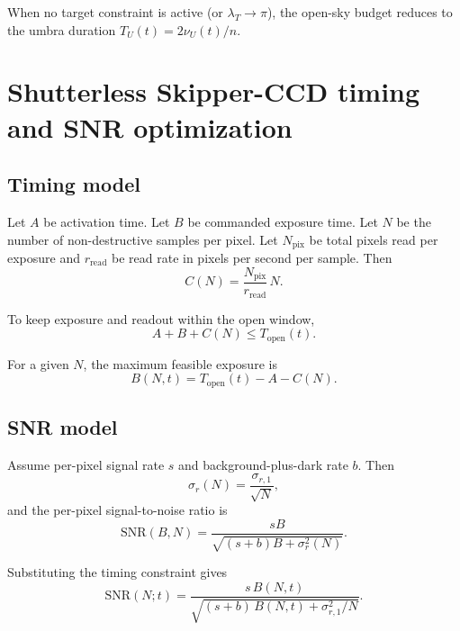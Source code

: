 \documentclass[preprint,12pt]{elsarticle}
\theoremstyle{definition}
\theoremstyle{remark}
\begin{document}
When no target constraint is active (or $\lambda_T \to \pi$), the open-sky budget reduces to the umbra duration $T_U(t)=2\nu_U(t)/n$.

\section{Shutterless Skipper-CCD timing and SNR optimization}

\subsection{Timing model}

Let $A$ be activation time.
Let $B$ be commanded exposure time.
Let $N$ be the number of non-destructive samples per pixel.
Let $N_{\mathrm{pix}}$ be total pixels read per exposure and $r_{\mathrm{read}}$ be read rate in pixels per second per sample.
Then
\begin{equation}
C(N)=\frac{N_{\mathrm{pix}}}{r_{\mathrm{read}}}\,N.
\label{eq:CN}
\end{equation}

To keep exposure and readout within the open window,
\begin{equation}
A+B+C(N)\le T_{\mathrm{open}}(t).
\label{eq:time_constraint}
\end{equation}

For a given $N$, the maximum feasible exposure is
\begin{equation}
B(N,t)=T_{\mathrm{open}}(t)-A-C(N).
\label{eq:BofN}
\end{equation}

\subsection{SNR model}

Assume per-pixel signal rate $s$ and background-plus-dark rate $b$.
Then
\begin{equation}
\sigma_r(N)=\frac{\sigma_{r,1}}{\sqrt{N}},
\label{eq:sigma_r}
\end{equation}
and the per-pixel signal-to-noise ratio is
\begin{equation}
\mathrm{SNR}(B,N)
=
\frac{sB}{\sqrt{(s+b)B + \sigma_r^2(N)}}.
\label{eq:SNR}
\end{equation}

Substituting the timing constraint gives
\begin{equation}
\mathrm{SNR}(N;t)
=
\frac{s\,B(N,t)}{\sqrt{(s+b)\,B(N,t)+\sigma_{r,1}^2/N}}.
\label{eq:SNR_Nt}
\end{equation}
\end{document}
